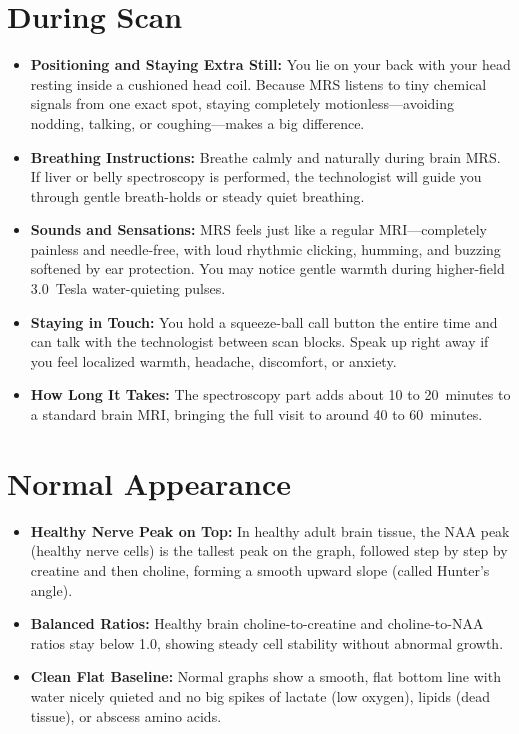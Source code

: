 \section{During Scan}
\begin{itemize}
\item \textbf{Positioning and Staying Extra Still:} You lie on your back with your head resting inside a cushioned head coil. Because MRS listens to tiny chemical signals from one exact spot, staying completely motionless---avoiding nodding, talking, or coughing---makes a big difference.
\item \textbf{Breathing Instructions:} Breathe calmly and naturally during brain MRS. If liver or belly spectroscopy is performed, the technologist will guide you through gentle breath-holds or steady quiet breathing.
\item \textbf{Sounds and Sensations:} MRS feels just like a regular MRI---completely painless and needle-free, with loud rhythmic clicking, humming, and buzzing softened by ear protection. You may notice gentle warmth during higher-field 3.0~Tesla water-quieting pulses.
\item \textbf{Staying in Touch:} You hold a squeeze-ball call button the entire time and can talk with the technologist between scan blocks. Speak up right away if you feel localized warmth, headache, discomfort, or anxiety.
\item \textbf{How Long It Takes:} The spectroscopy part adds about 10 to 20~minutes to a standard brain MRI, bringing the full visit to around 40 to 60~minutes.
\end{itemize}

\section{Normal Appearance}
\begin{itemize}
\item \textbf{Healthy Nerve Peak on Top:} In healthy adult brain tissue, the NAA peak (healthy nerve cells) is the tallest peak on the graph, followed step by step by creatine and then choline, forming a smooth upward slope (called Hunter's angle).
\item \textbf{Balanced Ratios:} Healthy brain choline-to-creatine and choline-to-NAA ratios stay below 1.0, showing steady cell stability without abnormal growth.
\item \textbf{Clean Flat Baseline:} Normal graphs show a smooth, flat bottom line with water nicely quieted and no big spikes of lactate (low oxygen), lipids (dead tissue), or abscess amino acids.
\end{itemize}

